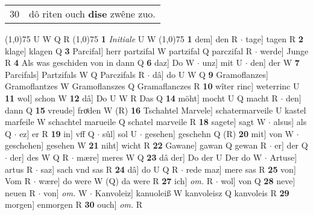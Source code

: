 \documentclass[8pt,a4paper,notitlepage]{article}
\begin{document}
\begin{table}[ht]
\begin{minipage}[t]{0.5\linewidth}
\begin{tabular}{rl}
30 & dô riten ouch \textbf{dise} zwêne zuo.\\ 
\end{tabular}
\scriptsize
\line(1,0){75} \newline
U W Q R \newline
\line(1,0){75} \newline
\textbf{1} \textit{Initiale} U W  \newline
\line(1,0){75} \newline
\textbf{1} dem] den R  $\cdot$ tage] tagen R \textbf{2} klage] klagen Q \textbf{3} Parcifal] herr partzifal W partzifal Q parczifal R  $\cdot$ werde] Junge R \textbf{4} Als was geschiden von in dann Q \textbf{6} daz] Do W  $\cdot$ unz] mit U  $\cdot$ den] der W \textbf{7} Parcifals] Partzifals W Q Parczifals R  $\cdot$ dâ] do U W Q \textbf{9} Gramoflanzes] Gramoflantzes W Gramoflanszes Q Gramaflanczes R \textbf{10} wîter rinc] weterrinc U \textbf{11} wol] schon W \textbf{12} dâ] Do U W R Das Q \textbf{14} möht] mocht U Q macht R  $\cdot$ den] dann Q \textbf{15} vreude] froͤden W (R) \textbf{16} Tschahtel Marvele] schatermarveile U kastel marfeile W schachtel marueile Q schatel marveile R \textbf{18} sagete] sagt W  $\cdot$ alsus] als Q  $\cdot$ ez] er R \textbf{19} in] vff Q  $\cdot$ sûl] sol U  $\cdot$ gesehen] geschehn Q (R) \textbf{20} mit] von W  $\cdot$ geschehen] gesehen W \textbf{21} niht] wicht R \textbf{22} Gawane] gawan Q gewan R  $\cdot$ er] der Q  $\cdot$ der] des W Q R  $\cdot$ mære] meres W Q \textbf{23} dâ der] Do der U Der do W  $\cdot$ Artuse] artus R  $\cdot$ saz] sach vnd sas R \textbf{24} dâ] do U Q R  $\cdot$ rede maz] mere sas R \textbf{25} von] Vom R  $\cdot$ wære] do were W (Q) da were R \textbf{27} ich] \textit{om.} R  $\cdot$ wol] von Q \textbf{28} neve] neuen R  $\cdot$ von] \textit{om.} W  $\cdot$ Kanvoleiz] kanuoleiß W kanvoleisz Q kanvoleis R \textbf{29} morgen] enmorgen R \textbf{30} ouch] \textit{om.} R \newline
\end{minipage}
\end{table}
\end{document}
